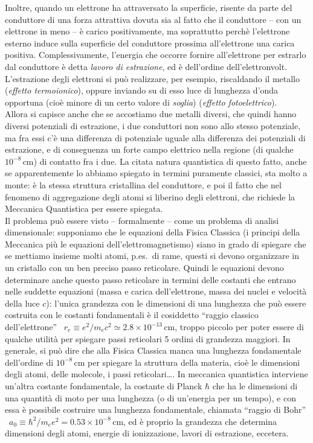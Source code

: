 Inoltre, quando un elettrone ha attraversato la superficie, risente da parte del
conduttore di una forza attrattiva dovuta sia al fatto che il conduttore -- con
un elettrone in meno -- \`e carico positivamente, ma soprattutto perch\`e
l'elettrone esterno induce sulla superficie del conduttore prossima
all'elettrone una carica positiva. Complessivamente, l'energia che occorre
fornire all'elettrone per estrarlo dal conduttore \`e detta \emph{lavoro di
estrazione}, ed \`e dell'ordine dell'elettronvolt.\\
L'estrazione degli elettroni si pu\`o realizzare, per esempio, riscaldando il
metallo (\emph{effetto termoionico}), oppure inviando su di esso luce di
lunghezza d'onda opportuna (cio\`e minore di un certo valore di \emph{soglia})
(\emph{effetto fotoelettrico}).\\
Allora si capisce anche che se accostiamo due metalli diversi, che quindi hanno
diversi potenziali di estrazione, i due conduttori non sono allo stesso
potenziale, ma fra essi c'\`e una differenza di potenziale uguale alla
differenza dei potenziali di estrazione, e di conseguenza un forte campo
elettrico nella regione (di qualche $10^{-8}$\,cm) di contatto fra i due. La
citata natura quantistica di questo fatto, anche se apparentemente lo abbiamo
spiegato in termini puramente classici, sta molto a monte: \`e la stessa
struttura cristallina del conduttore, e poi il fatto che nel fenomeno di
aggregazione degli atomi si liberino degli elettroni, che richiede la Meccanica
Quantistica per essere spiegata.\\
Il problema pu\`o essere visto -- formalmente -- come un problema di analisi
dimensionale: supponiamo che le equazioni della Fisica Classica (i principi
della Meccanica pi\`u le equazioni dell'elettromagnetismo) siano in grado di
spiegare che se mettiamo insieme molti atomi, p.es.\ di rame, questi si devono
organizzare in un cristallo con un ben preciso passo reticolare. Quindi le
equazioni devono determinare anche questo passo reticolare in termini delle
costanti che entrano nelle suddette equazioni (massa e carica dell'elettrone,
massa dei nuclei e velocit\`a della luce $c$): l'unica grandezza con le
dimensioni di una lunghezza che pu\`o essere costruita con le costanti
fondamentali \`e il cosiddetto ``raggio classico dell'elettrone''
\ $r_e\equiv e^2/m_ec^2\simeq2.8\times10^{-13}$\,cm, troppo piccolo per poter
essere di qualche utilit\`a per spiegare passi reticolari 5 ordini di grandezza
maggiori. In generale, si pu\`o dire che alla Fisica Classica manca una
lunghezza fondamentale dell'ordine di $10^{-8}$\,cm per spiegare la struttura
della materia, cio\`e le dimensioni degli atomi, delle molecole, i passi
reticolari\dots. In meccanica quantistica interviene un'altra costante
fondamentale, la costante di Planck $\hbar$ che ha le dimensioni di una
quantit\`a di moto per una lunghezza (o di un'energia per un tempo), e con essa
\`e possibile costruire una lunghezza fondamentale, chiamata ``raggio di Bohr''
\ $a_0\equiv\hbar^2/m_ee^2=0.53\times10^{-8}$\,cm, ed \`e proprio la grandezza
che determina dimensioni degli atomi, energie di ionizzazione, lavori di
estrazione, eccetera.

